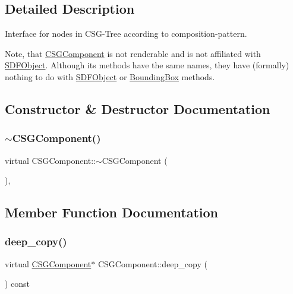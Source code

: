 \subsection{Detailed Description}
Interface for nodes in C\+S\+G-\/\+Tree according to composition-\/pattern. 

Note, that \mbox{\hyperlink{classCSGComponent}{C\+S\+G\+Component}} is not renderable and is not affiliated with \mbox{\hyperlink{classSDFObject}{S\+D\+F\+Object}}. Although its methods have the same names, they have (formally) nothing to do with \mbox{\hyperlink{classSDFObject}{S\+D\+F\+Object}} or \mbox{\hyperlink{classBoundingBox}{Bounding\+Box}} methods. 

\subsection{Constructor \& Destructor Documentation}
\mbox{\label{classCSGComponent_ab46aa06021795ff83ff2fdf991e5e77d}} 
\subsubsection{\texorpdfstring{$\sim$CSGComponent()}{~CSGComponent()}}
{\footnotesize\ttfamily virtual C\+S\+G\+Component\+::$\sim$\+C\+S\+G\+Component (\begin{DoxyParamCaption}{ }\end{DoxyParamCaption})\hspace{0.3cm}{\ttfamily [virtual]}, {\ttfamily [default]}}



\subsection{Member Function Documentation}
\mbox{\label{classCSGComponent_a98d3accd23c28259cbf490f4d7acbe83}} 
\subsubsection{\texorpdfstring{deep\_copy()}{deep\_copy()}}
{\footnotesize\ttfamily virtual \mbox{\hyperlink{classCSGComponent}{C\+S\+G\+Component}}$\ast$ C\+S\+G\+Component\+::deep\+\_\+copy (\begin{DoxyParamCaption}{ }\end{DoxyParamCaption}) const\hspace{0.3cm}{\ttfamily [pure virtual]}}



